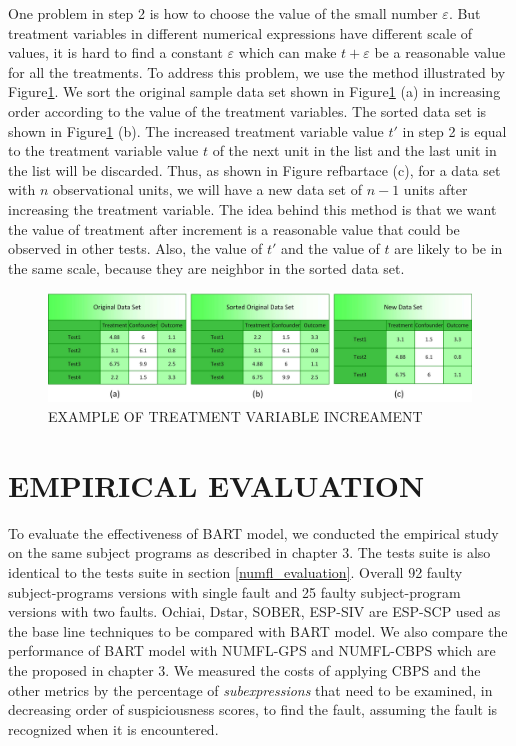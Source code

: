 One problem in step 2 is how to choose the value of the small number $\varepsilon $. But treatment variables in different numerical expressions have different scale of values, it is hard to find a constant $\varepsilon$ which can make $t+\varepsilon$ be a reasonable value for all the treatments. To address this problem, we use the method illustrated by Figure\ref{bartace}.  We sort the original sample data set shown in Figure\ref{bartace} (a) in increasing order according to the value of the treatment variables.  The sorted data set is shown in Figure\ref{bartace} (b). The increased treatment variable value $t'$ in step 2 is equal to the treatment variable value $t$ of the next unit in the list and the last unit in the list will be discarded. Thus, as shown in Figure ref{bartace} (c), for a data set with $n$ observational units, we will have a new data set of $n-1$ units after increasing the treatment variable. The idea behind this method is that we want the value of treatment after increment is a reasonable value that could be observed in  other tests. Also, the value of $t'$ and the value of $t$ are likely to be in the same scale, because they are neighbor in the sorted data set.

\begin{figure}[!thpb]
\centering
\includegraphics[width=1\textwidth]{chapter4_BART_ACE.pdf}
\caption{EXAMPLE OF TREATMENT VARIABLE INCREAMENT}
\label{bartace}
\end{figure}

\section{EMPIRICAL EVALUATION}\label{BARTevaluation}%

To evaluate the effectiveness of BART model, we conducted the empirical study on the same subject programs as described in chapter 3.  The tests suite is also identical to the tests suite in section \ref{numfl_evaluation}.  Overall 92 faulty subject-programs versions with single fault and 25 faulty subject-program versions with two faults. Ochiai, Dstar, SOBER, ESP-SIV are ESP-SCP used as the base line techniques to be compared with BART model. We also compare the performance of BART model with NUMFL-GPS and NUMFL-CBPS which are the proposed in chapter 3. We measured the costs of applying CBPS and the other metrics by the percentage of {\it subexpressions} that need to be examined, in decreasing order of suspiciousness scores, to find the fault, assuming the fault is recognized when it is encountered. 

